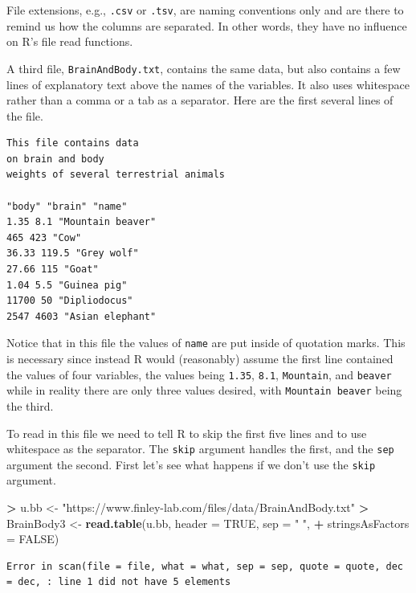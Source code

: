 \documentclass[
]{krantz}
\makeatletter
\newenvironment{Shaded}{\begin{snugshade}}{\end{snugshade}}
\newcommand{\DataTypeTok}[1]{\textcolor[rgb]{0.27,0.27,0.27}{#1}}
\newcommand{\KeywordTok}[1]{\textcolor[rgb]{0.27,0.27,0.27}{\textbf{#1}}}
\newcommand{\NormalTok}[1]{#1}
\newcommand{\OperatorTok}[1]{\textcolor[rgb]{0.43,0.43,0.43}{\textbf{#1}}}
\newcommand{\OtherTok}[1]{\textcolor[rgb]{0.37,0.37,0.37}{#1}}
\newcommand{\StringTok}[1]{\textcolor[rgb]{0.5,0.5,0.5}{#1}}
\newenvironment{kframe}{%
\medskip{}
\setlength{\fboxsep}{.8em}
 \def\at@end@of@kframe{}%
 \ifinner\ifhmode%
  \def\at@end@of@kframe{\end{minipage}}%
  \begin{minipage}{\columnwidth}%
 \fi\fi%
 \def\FrameCommand##1{\hskip\@totalleftmargin \hskip-\fboxsep
 \colorbox{shadecolor}{##1}\hskip-\fboxsep
     \hskip-\linewidth \hskip-\@totalleftmargin \hskip\columnwidth}%
 \MakeFramed {\advance\hsize-\width
   \@totalleftmargin\z@ \linewidth\hsize
   \@setminipage}}%
 {\par\unskip\endMakeFramed%
 \at@end@of@kframe}
\renewenvironment{Shaded}{\begin{kframe}}{\end{kframe}}
\makeatother
\begin{document}
File extensions, e.g., \texttt{.csv} or \texttt{.tsv}, are naming conventions only and are there to remind us how the columns are separated. In other words, they have no influence on R's file read functions.

A third file, \texttt{BrainAndBody.txt}, contains the same data, but also contains a few lines of explanatory text above the names of the variables. It also uses whitespace rather than a comma or a tab as a separator. Here are the first several lines of the file.

\begin{verbatim}
This file contains data
on brain and body
weights of several terrestrial animals

"body" "brain" "name"
1.35 8.1 "Mountain beaver"
465 423 "Cow"
36.33 119.5 "Grey wolf"
27.66 115 "Goat"
1.04 5.5 "Guinea pig"
11700 50 "Dipliodocus"
2547 4603 "Asian elephant"
\end{verbatim}

Notice that in this file the values of \texttt{name} are put inside of quotation marks. This is necessary since instead R would (reasonably) assume the first line contained the values of four variables, the values being \texttt{1.35}, \texttt{8.1}, \texttt{Mountain}, and \texttt{beaver} while in reality there are only three values desired, with \texttt{Mountain\ beaver} being the third.

To read in this file we need to tell R to skip the first five lines and to use whitespace as the separator. The \texttt{skip} argument handles the first, and the \texttt{sep} argument the second. First let's see what happens if we don't use the \texttt{skip} argument.

\begin{Shaded}
\begin{Highlighting}[]
\OperatorTok{\textgreater{}}\StringTok{ }\NormalTok{u.bb \textless{}{-}}\StringTok{ "https://www.finley{-}lab.com/files/data/BrainAndBody.txt"}
\OperatorTok{\textgreater{}}\StringTok{ }\NormalTok{BrainBody3 \textless{}{-}}\StringTok{ }\KeywordTok{read.table}\NormalTok{(u.bb, }\DataTypeTok{header =} \OtherTok{TRUE}\NormalTok{, }\DataTypeTok{sep =} \StringTok{" "}\NormalTok{, }
\OperatorTok{+}\StringTok{                          }\DataTypeTok{stringsAsFactors =} \OtherTok{FALSE}\NormalTok{)}
\end{Highlighting}
\end{Shaded}

\begin{verbatim}
Error in scan(file = file, what = what, sep = sep, quote = quote, dec = dec, : line 1 did not have 5 elements
\end{verbatim}
\end{document}
